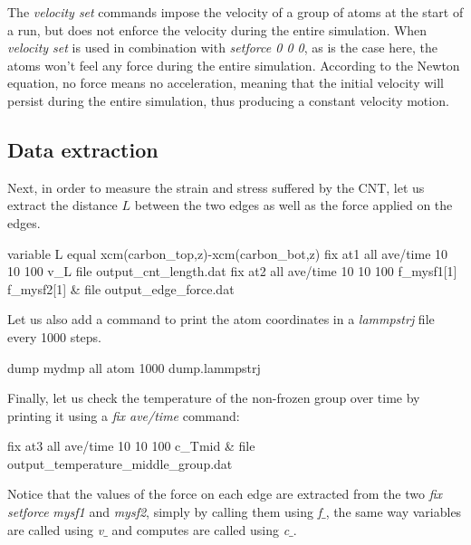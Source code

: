 \begin{tcolorbox}[colback=mylightblue!5!white,colframe=mylightblue!75!black,title=On imposing a constant velocity to a system]

\vspace{0.25cm} \noindent The \textit{velocity set} commands impose the velocity of a group of atoms at the start of 
a run, but does not enforce the velocity during the entire simulation. 
When \textit{velocity set} is used in combination with \textit{setforce 0 0 0}, 
as is the case here, the atoms
won't feel any force during the entire simulation. According to the Newton equation,
no force means no acceleration, meaning that the initial velocity will persist
during the entire simulation, thus producing a constant velocity motion.
\end{tcolorbox}

\subsection{Data extraction}
Next, in order to measure the strain and stress suffered by the
CNT, let us extract the distance $L$ between
the two edges as well as the force applied on the edges.

\begin{lcverbatim}
variable L equal xcm(carbon_top,z)-xcm(carbon_bot,z)
fix at1 all ave/time 10 10 100 v_L file output_cnt_length.dat
fix at2 all ave/time 10 10 100 f_mysf1[1] f_mysf2[1] &
    file output_edge_force.dat
\end{lcverbatim}

\noindent Let us also add a command to print the atom coordinates in a
\textit{lammpstrj} file every 1000 steps.

\begin{lcverbatim}
dump mydmp all atom 1000 dump.lammpstrj
\end{lcverbatim}

\noindent Finally, let us check the temperature of the non-frozen group over time
by printing it using a \textit{fix ave/time} command:

\begin{lcverbatim}
fix at3 all ave/time 10 10 100 c_Tmid &
    file output_temperature_middle_group.dat
\end{lcverbatim}

\noindent \begin{tcolorbox}[colback=mylightblue!5!white,colframe=mylightblue!75!black,title=About extracting quantity from variable compute or fix]

\vspace{0.25cm} \noindent Notice that the values of the force on each edge are
extracted from the two \textit{fix setforce} \textit{mysf1} and \textit{mysf2}, simply by
calling them using \textit{f$\_$}, the same way variables are called
using \textit{v$\_$} and computes are called using \textit{c$\_$}.
\end{tcolorbox}

